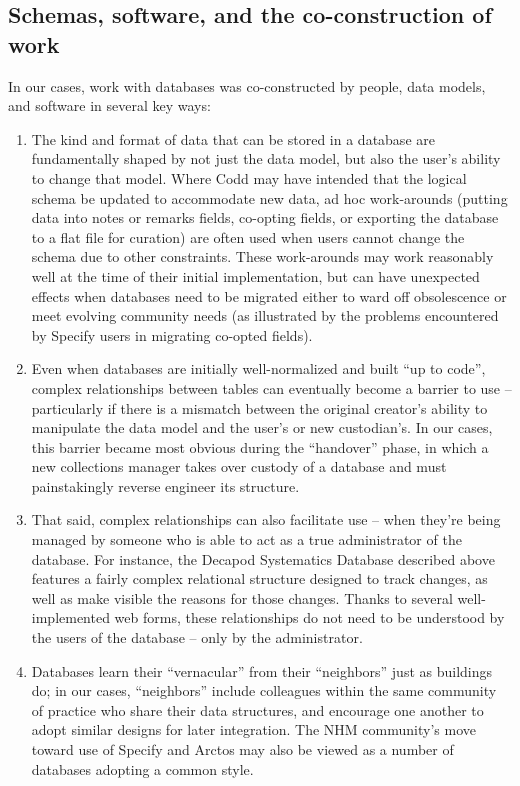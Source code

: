 \subsection{Schemas, software, and the co-construction of work}

In our cases, work with databases was co-constructed by people, data models, and software in several key ways: 
\begin{enumerate}
\item The kind and format of data that can be stored in a database are fundamentally shaped by not just the data model, but also the user’s ability to change that model. Where Codd may have intended that the logical schema be updated to accommodate new data, ad hoc work-arounds (putting data into notes or remarks fields, co-opting fields, or exporting the database to a flat file for curation) are often used when users cannot change the schema due to other constraints. These work-arounds may work reasonably well at the time of their initial implementation, but can have unexpected effects when databases need to be migrated either to ward off obsolescence or meet evolving community needs (as illustrated by the problems encountered by Specify users in migrating co-opted fields). 

\item Even when databases are initially well-normalized and built “up to code”, complex relationships between tables can eventually become a barrier to use – particularly if there is a mismatch between the original creator’s ability to manipulate the data model and the user’s or new custodian’s. In our cases, this barrier became most obvious during the “handover” phase, in which a new collections manager takes over custody of a database and must painstakingly reverse engineer its structure. 
\item That said, complex relationships can also facilitate use -- when they’re being managed by someone who is able to act as a true administrator of the database. For instance, the Decapod Systematics Database described above features a fairly complex relational structure designed to track changes, as well as make visible the reasons for those changes. Thanks to several well-implemented web forms, these relationships do not need to be understood by the users of the database – only by the administrator.
\item Databases learn their “vernacular” from their “neighbors” just as buildings do; in our cases, “neighbors” include colleagues within the same community of practice who share their data structures, and encourage one another to adopt similar designs for later integration. The NHM community’s move toward use of Specify and Arctos may also be viewed as a number of databases adopting a common style. 
\end{enumerate}

